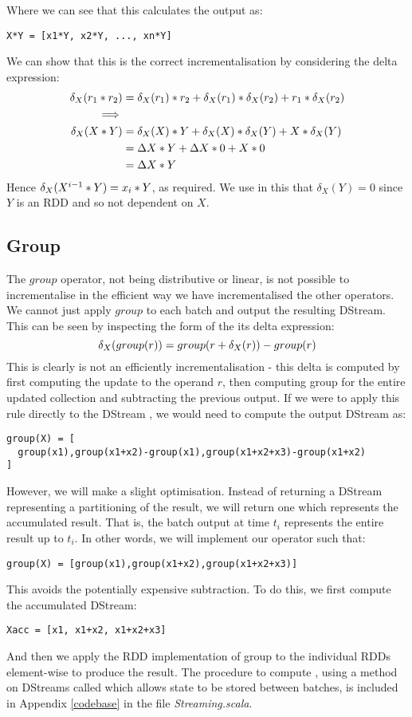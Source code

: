 Where we can see that this calculates the output as:
\vs\begin{lstlisting}
X*Y = [x1*Y, x2*Y, ..., xn*Y]
\end{lstlisting}\vs
We can show that this is the correct incrementalisation by considering the delta expression:
\begin{equation*}
\begin{split}
\delta_X(r_1 * r_2) &= \delta_X(r_1)*r_2 + \delta_X(r_1)*\delta_X(r_2) + r_1*\delta_X(r_2) \\
\implies \\
\delta_X(X*Y)& = \delta_X(X)*Y + \delta_X(X)*\delta_X(Y) + X*\delta_X(Y) \\
	  &= \Delta X*Y + \Delta X*0 + X*0 \\
	  &= \Delta X*Y
\end{split}
\end{equation*}
Hence $\delta_X(X^{i-1}*Y) = x_i*Y$, as required. We use in this that $\delta_X(Y) = 0$ since $Y$ is an RDD and so not dependent on $X$.

\subsection{Group}
The $group$ operator, not being distributive or linear, is not possible to incrementalise in the efficient way we have incrementalised the other operators. We cannot just apply $group$ to each batch and output the resulting DStream. This can be seen by inspecting the form of the its delta expression:
\begin{equation*}
\delta_X(group(r)) = group(r + \delta_X(r)) - group(r)
\end{equation*}
This is clearly is not an efficiently incrementalisation - this delta is computed by first computing the update to the operand $r$, then computing group for the entire updated collection and subtracting the previous output. If we were to apply this rule directly to the DStream , we would need to compute the output DStream as:
\vs\begin{lstlisting}
group(X) = [
  group(x1),group(x1+x2)-group(x1),group(x1+x2+x3)-group(x1+x2)
]
\end{lstlisting}\vs
However, we will make a slight optimisation. Instead of returning a DStream representing a partitioning of the result, we will return one which represents the accumulated result. That is, the batch output at time $t_i$ represents the entire result up to $t_i$. In other words, we will implement our operator such that:
\vs\begin{lstlisting}
group(X) = [group(x1),group(x1+x2),group(x1+x2+x3)]
\end{lstlisting}\vs
This avoids the potentially expensive subtraction. To do this, we first compute the accumulated DStream:
\vs\begin{lstlisting}
Xacc = [x1, x1+x2, x1+x2+x3]
\end{lstlisting}
And then we apply the RDD implementation of group to the individual RDDs element-wise to produce the result. The procedure to compute , using a method on DStreams called  which allows state to be stored between batches, is included in Appendix \ref{codebase} in the file \textit{Streaming.scala}.



